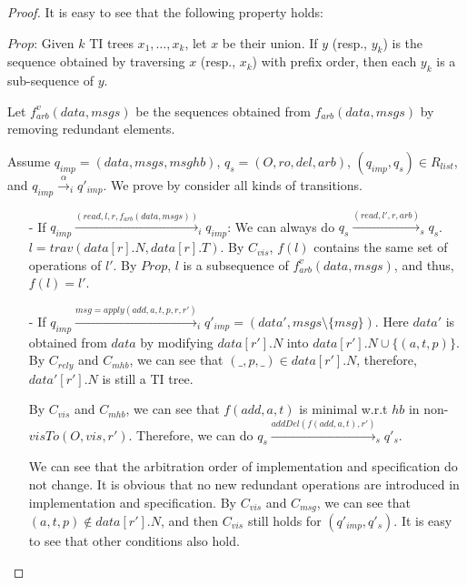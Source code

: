 \begin {proof}

It is easy to see that the following property holds:

$\mathit{Prop}$: Given $k$ TI trees $x_1,\ldots,x_k$, let $x$ be their union. If $y$ (resp., $y_k$) is the sequence obtained by traversing $x$ (resp., $x_k$) with prefix order, then each $y_k$ is a sub-sequence of $y$.

Let $f_{\mathit{arb}}^v(\mathit{data},\mathit{msgs})$ be the sequences obtained from $f_{\mathit{arb}}(\mathit{data},\mathit{msgs})$ by removing redundant elements.

Assume $q_{\mathit{imp}} = (\mathit{data},\mathit{msgs},\mathit{msghb})$, $q_s = (O,\mathit{ro},\mathit{del},\mathit{arb})$, $(q_{\mathit{imp}},q_s) \in R_{\mathit{list}}$, and $q_{\mathit{imp}} \xrightarrow{\alpha}_i q'_{\mathit{imp}}$. We prove by consider all kinds of transitions.

\begin{itemize}
\setlength{\itemsep}{0.5pt}
\item[-] If $q_{\mathit{imp}} \xrightarrow{( \mathit{read},l,r,f_{\mathit{arb}}(\mathit{data},\mathit{msgs}) )}_i q_{\mathit{imp}}$: We can always do $q_s \xrightarrow{( \mathit{read},l',r,\mathit{arb} )}_s q_s$. $l = \mathit{trav}(\mathit{data}[r].N, \mathit{data}[r].T)$. By $C_{\mathit{vis}}$, $f(l)$ contains the same set of operations of $l'$. By $\mathit{Prop}$, $l$ is a subsequence of $f_{\mathit{arb}}^v(\mathit{data},\mathit{msgs})$, and thus, $f(l) = l'$.

\item[-] If $q_{\mathit{imp}} \xrightarrow{ \mathit{msg} = \mathit{apply}( \mathit{add},a,t,p,r,r' )}_i q'_{\mathit{imp}} = (\mathit{data}',\mathit{msgs} \setminus \{ \mathit{msg} \})$. Here $\mathit{data}'$ is obtained from $\mathit{data}$ by modifying $\mathit{data}[r'].N$ into $\mathit{data}[r'].N \cup \{ (a,t,p) \}$. By $C_{\mathit{rely}}$ and $C_{\mathit{mhb}}$, we can see that $(\_,p,\_) \in \mathit{data}[r'].N$, therefore, $\mathit{data}'[r'].N$ is still a TI tree.

    By $C_{\mathit{vis}}$ and $C_{\mathit{mhb}}$, we can see that $f(\mathit{add},a,t)$ is minimal w.r.t $\mathit{hb}$ in non-$\mathit{visTo}(O,\mathit{vis},r')$. Therefore, we can do $q_s \xrightarrow{ \mathit{addDel}( f(\mathit{add},a,t),r' )}_s q'_s$.

    We can see that the arbitration order of implementation and specification do not change. It is obvious that no new redundant operations are introduced in implementation and specification. By $C_{\mathit{vis}}$ and $C_{\mathit{msg}}$, we can see that $(a,t,p) \notin \mathit{data}[r'].N$, and then $C_{\mathit{vis}}$ still holds for $(q'_{\mathit{imp}},q'_s)$. It is easy to see that other conditions also hold.



\end{itemize}
\end{proof}
